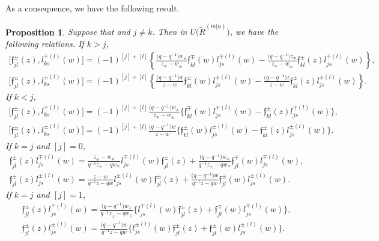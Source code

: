 \documentclass[pdftex]{sigma}
\numberwithin{equation}{section}
\newtheorem{Proposition}[Theorem]{Proposition}
 { \theoremstyle{definition}
\newtheorem{Definition}[Theorem]{Definition}
\newtheorem{Note}[Theorem]{Note}
\newtheorem{Example}[Theorem]{Example}
\newtheorem{Remark}[Theorem]{Remark} }
\begin{document}
As a consequence, we have the following result.
\begin{Proposition}\label{pr4}
Suppose that  and $j\neq \overline{k}$. Then in $U\bigl(\widetilde{R}^{(m|n)}\bigr)$, we have the following relations.
If $k>j$,
\begin{gather*}
 \bigl[\mathfrak{f}_{jl}^{\pm}(z), l_{ks}^{\mp(l)}(w)\bigr]=(-1)^{[j]+[l]}\left\{\frac{\bigl(q-q^{-1}\bigr)w_{\pm}}{z_{\mp}-w_{\pm}}\mathfrak{f}_{kl}^{\mp}(w)l_{js}^{\mp(l)}(w) -\frac{\bigl(q-q^{-1}\bigr)z_{\mp}}{z_{\mp}-w_{\pm}}\mathfrak{f}_{kl}^{\pm}(z)l_{js}^{\mp(l)}(w)\right\},\\
 \bigl[\mathfrak{f}_{jl}^{\pm}(z), l_{ks}^{\pm(l)}(w)\bigr]=(-1)^{[j]+[l]}\left\{\frac{\bigl(q-q^{-1}\bigr)w}{z-w}\mathfrak{f}_{kl}^{\pm}(w)l_{js}^{\pm(l)}(w) -\frac{\bigl(q-q^{-1}\bigr)z}{z-w}\mathfrak{f}_{kl}^{\pm}(z)l_{js}^{\pm(l)}(w)\right\}.
\end{gather*}
If $k<j$,
\begin{gather*}
 \bigl[\mathfrak{f}_{jl}^{\pm}(z), l_{ks}^{\mp(l)}(w)\bigr]=(-1)^{[j]+[l]}\frac{\bigl(q-q^{-1}\bigr)w_{\mp}}{z_{\mp}-w_{\pm}}\bigl\{\mathfrak{f}_{kl}^{\mp}(w)l_{js}^{\mp(l)}(w) -\mathfrak{f}_{kl}^{\pm}(z)l_{js}^{\mp(l)}(w)\bigr\},\\
 \bigl[\mathfrak{f}_{jl}^{\pm}(z), l_{ks}^{\pm(l)}(w)\bigr]=(-1)^{[j]+[l]}\frac{\bigl(q-q^{-1}\bigr)w}{z-w}\bigl\{\mathfrak{f}_{kl}^{\pm}(w)l_{js}^{\pm(l)}(w) -\mathfrak{f}_{kl}^{\pm}(z)l_{js}^{\pm(l)}(w)\bigr\}.
\end{gather*}
If $k=j$ and $[j]=0$,
\begin{gather*}
 \mathfrak{f}_{jl}^{\pm}(z)l_{js}^{\mp(l)}(w)=\frac{z_{\pm}-w_{\mp}}{q^{-1}z_{\pm}-qw_{\mp}}l_{js}^{\mp(l)}(w)\mathfrak{f}_{jl}^{\pm}(z) +\frac{\bigl(q-q^{-1}\bigr)w_{\mp}}{q^{-1}z_{\pm}-qw_{\mp}}\mathfrak{f}_{jl}^{\mp}(w)l_{js}^{\mp(l)}(w),\\
 \mathfrak{f}_{jl}^{\pm}(z)l_{js}^{\pm(l)}(w)=\frac{z-w}{q^{-1}z-qw}l_{js}^{\pm(l)}(w)\mathfrak{f}_{jl}^{\pm}(z) +\frac{\bigl(q-q^{-1}\bigr)w}{q^{-1}z-qw}\mathfrak{f}_{jl}^{\pm}(w)l_{js}^{\pm(l)}(w).
\end{gather*}
If $k=j$ and $[j]=1$,
\begin{gather*}
 \mathfrak{f}_{jl}^{\pm}(z)l_{js}^{\mp(l)}(w)=\frac{\bigl(q-q^{-1}\bigr)w_{\mp}}{q^{-1}z_{\pm}-qw_{\mp}}\bigl\{l_{js}^{\mp(l)}(w)\mathfrak{f}_{jl}^{\pm}(z) +\mathfrak{f}_{jl}^{\mp}(w)l_{js}^{\mp(l)}(w)\bigr\},\\
 \mathfrak{f}_{jl}^{\pm}(z)l_{js}^{\pm(l)}(w)=\frac{\bigl(q-q^{-1}\bigr)w}{q^{-1}z-qw}\bigl\{l_{js}^{\pm(l)}(w)\mathfrak{f}_{jl}^{\pm}(z) +\mathfrak{f}_{jl}^{\pm}(w)l_{js}^{\pm(l)}(w)\bigr\}.
\end{gather*}
\end{Proposition}
\end{document}
